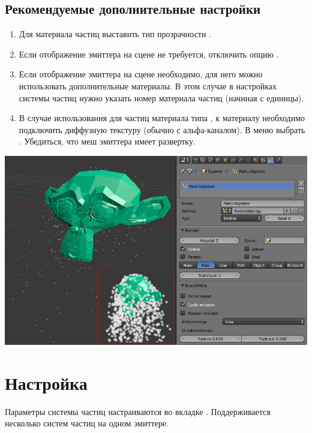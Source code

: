 \documentclass[a4paper,12pt,oneside]{sphinxmanual}
\begin{document}
\subsection{Рекомендуемые дополнительные настройки}
\label{particles:id4}\begin{enumerate}
\item {} 
Для материала частиц выставить тип прозрачности .

\item {} 
Если отображение эмиттера на сцене не требуется, отключить опцию .

\item {} 
Если отображение эмиттера на сцене необходимо, для него можно использовать дополнительные материалы. В этом случае в настройках системы частиц нужно указать номер материала частиц  (начиная с единицы).

\item {} 
В случае использования для частиц материала типа , к материалу необходимо подключить диффузную текстуру (обычно с альфа-каналом). В меню  выбрать .  Убедиться, что меш эмиттера имеет развертку.

\end{enumerate}

{\hfill\includegraphics[width=1.000\linewidth]{particles_first_steps.jpg}\hfill}


\section{Настройка}
\label{particles:id5}
Параметры системы частиц настраиваются во вкладке . Поддерживается несколько систем частиц на одном эмиттере.
\end{document}
